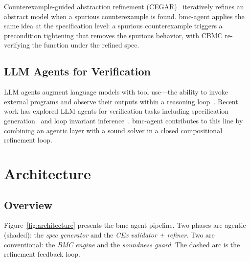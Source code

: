 \documentclass[11pt,a4paper]{article}
\newcommand{\tool}{bmc-agent\xspace}
\begin{document}
Counterexample-guided abstraction refinement
(CEGAR)~\cite{cegar} iteratively refines an abstract model when a spurious
counterexample is found. \tool applies the same idea at the specification
level: a spurious counterexample triggers a precondition tightening that
removes the spurious behavior, with CBMC re-verifying the function under the
refined spec.

\subsection{LLM Agents for Verification}

LLM agents augment language models with tool use---the ability to invoke
external programs and observe their outputs within a reasoning
loop~\cite{react}. Recent work has explored LLM agents for verification tasks
including specification generation~\cite{fmagent,autospec,lemur} and
loop invariant inference~\cite{wu-invariants}. \tool contributes to this line by combining
an agentic layer with a sound solver in a closed compositional refinement loop.

\section{Architecture}
\label{sec:architecture}

\subsection{Overview}

Figure~\ref{fig:architecture} presents the \tool pipeline. Two phases are
agentic (shaded): the \emph{spec generator} and the \emph{CEx validator +
refiner}. Two are conventional: the \emph{BMC engine} and the \emph{soundness
guard}. The dashed arc is the refinement feedback loop.
\end{document}
